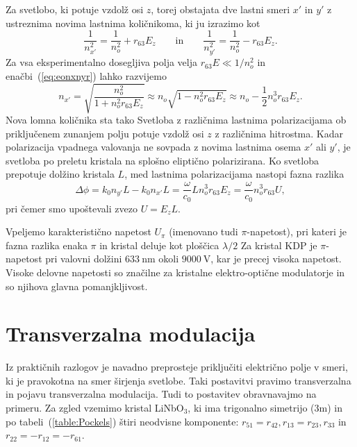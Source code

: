 Za svetlobo, 
ki potuje vzdolž osi $z$, torej obstajata dve lastni smeri $x'$ in $y'$ z ustreznima
novima lastnima količnikoma, ki ju izrazimo kot
\begin{equation}
\frac{1}{n_{x'}^2} = \frac{1}{n_o^2}+ r_{63}E_z \qquad \mathrm{in} \qquad 
\frac{1}{n_{y'}^2} = \frac{1}{n_o^2}- r_{63}E_z. 
\label{eq:eonxnyr}
\end{equation}
Za vsa eksperimentalno dosegljiva polja velja $r_{63}E\ll1/n_o^2$ in 
enačbi~(\ref{eq:eonxnyr}) lahko razvijemo
\begin{equation}
n_{x'} = \sqrt{\frac{n_o^2}{1+ n_o^2 r_{63}E_z}} \approx n_o \sqrt{1- n_o^2 r_{63}E_z} \approx
n_o - \frac{1}{2}n_o^3 r_{63}E_z.
\end{equation}
Nova lomna količnika sta tako 
Svetloba z različnima lastnima polarizacijama ob priključenem zunanjem polju potuje vzdolž 
osi $z$ z različnima hitrostma. 
Kadar polarizacija vpadnega valovanja ne sovpada z novima lastnima osema $x'$ ali $y'$, je 
svetloba po preletu kristala na splošno eliptično polarizirana. Ko svetloba
prepotuje dolžino kristala $L$, med lastnima polarizacijama nastopi fazna razlika
\begin{equation}
\Delta \phi = k_0 n_{y'} L - k_0 n_{x'} L = \frac{\omega}{c_0}L 
n_o^3 r_{63}E_z = \frac{\omega}{c_0} n_o^3 r_{63}U,
\label{phiAM}
\end{equation} 
pri čemer smo upoštevali zvezo $U = E_zL$. 

Vpeljemo karakteristično napetost $U_\pi$ (imenovano tudi $\pi$-napetost), 
pri kateri je 
fazna razlika enaka $\pi$ in kristal deluje kot ploščica $\lambda/2$
Za kristal KDP je $\pi$-napetost pri valovni 
dolžini $633~\si{\nano\metre}$ okoli  $9000~\si{\volt}$, kar 
je precej visoka napetost. Visoke delovne napetosti
so značilne za kristalne elektro-optične modulatorje in so njihova
glavna pomanjkljivost. 

\section{Transverzalna modulacija}
Iz praktičnih razlogov je navadno preprosteje priključiti električno polje v smeri, ki 
je pravokotna na smer širjenja svetlobe. Taki postavitvi pravimo transverzalna in pojavu
transverzalna modulacija.
Tudi to postavitev obravnavajmo na primeru. Za zgled vzemimo kristal LiNbO$_3$, ki 
ima trigonalno simetrijo (3m) in po tabeli~(\ref{table:Pockels}) štiri 
neodvisne komponente: $r_{51}=r_{42}, r_{13}=r_{23}, r_{33}$ in $r_{22}=-r_{12}=-r_{61}$.

